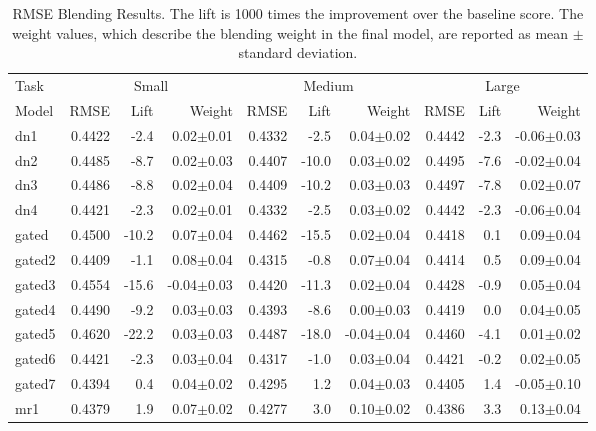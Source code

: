 \documentclass{article}
\begin{document}
\begin{table}[t]
\caption{RMSE Blending Results.  The lift is 1000 times the improvement over the baseline score.  The weight values, which describe the blending weight in the final model, are reported as mean $\pm$ standard deviation.}
\label{table:rmse-results}
\vskip 0.15in
\begin{center}
\begin{small}
\begin{sc}
\begin{tabular}{l|rr r|rr r|rr r}
\hline
\abovespace\belowspace
Task & \multicolumn{3}{|c}{Small} & \multicolumn{3}{|c}{Medium} & \multicolumn{3}{|c}{Large} \\
Model
& RMSE & Lift & Weight 
& RMSE & Lift & Weight 
& RMSE & Lift & Weight \\
\hline
\abovespace
dn1        & 0.4422 &  -2.4 &  0.02$\pm$0.01& 0.4332 &  -2.5 &  0.04$\pm$0.02& 0.4442 &  -2.3 & -0.06$\pm$0.03 \\ 
dn2        & 0.4485 &  -8.7 &  0.02$\pm$0.03& 0.4407 & -10.0 &  0.03$\pm$0.02& 0.4495 &  -7.6 & -0.02$\pm$0.04 \\ 
dn3        & 0.4486 &  -8.8 &  0.02$\pm$0.04& 0.4409 & -10.2 &  0.03$\pm$0.03& 0.4497 &  -7.8 &  0.02$\pm$0.07 \\ 
dn4        & 0.4421 &  -2.3 &  0.02$\pm$0.01& 0.4332 &  -2.5 &  0.03$\pm$0.02& 0.4442 &  -2.3 & -0.06$\pm$0.04 \\ 
\abovespace
gated      & 0.4500 & -10.2 &  0.07$\pm$0.04& 0.4462 & -15.5 &  0.02$\pm$0.04& 0.4418 &   0.1 &  0.09$\pm$0.04 \\ 
gated2     & 0.4409 &  -1.1 &  0.08$\pm$0.04& 0.4315 &  -0.8 &  0.07$\pm$0.04& 0.4414 &   0.5 &  0.09$\pm$0.04 \\ 
gated3     & 0.4554 & -15.6 & -0.04$\pm$0.03& 0.4420 & -11.3 &  0.02$\pm$0.04& 0.4428 &  -0.9 &  0.05$\pm$0.04 \\ 
gated4     & 0.4490 &  -9.2 &  0.03$\pm$0.03& 0.4393 &  -8.6 &  0.00$\pm$0.03& 0.4419 &   0.0 &  0.04$\pm$0.05 \\ 
gated5     & 0.4620 & -22.2 &  0.03$\pm$0.03& 0.4487 & -18.0 & -0.04$\pm$0.04& 0.4460 &  -4.1 &  0.01$\pm$0.02 \\ 
gated6     & 0.4421 &  -2.3 &  0.03$\pm$0.04& 0.4317 &  -1.0 &  0.03$\pm$0.04& 0.4421 &  -0.2 &  0.02$\pm$0.05 \\ 
gated7     & 0.4394 &   0.4 &  0.04$\pm$0.02& 0.4295 &   1.2 &  0.04$\pm$0.03& 0.4405 &   1.4 & -0.05$\pm$0.10 \\ 
\abovespace
mr1        & 0.4379 &   1.9 &  0.07$\pm$0.02& 0.4277 &   3.0 &  0.10$\pm$0.02& 0.4386 &   3.3 &  0.13$\pm$0.04 \\ 

\end{tabular}
\end{sc}
\end{small}
\end{center}
\end{table}
\end{document}

